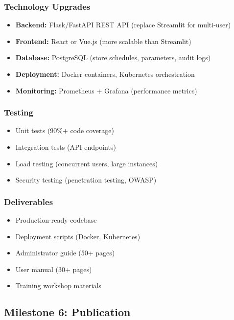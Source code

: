 \documentclass[11pt,letterpaper]{article}
\begin{document}
\subsubsection{Technology Upgrades}
\begin{itemize}[leftmargin=*]
    \item \textbf{Backend:} Flask/FastAPI REST API (replace Streamlit for multi-user)
    \item \textbf{Frontend:} React or Vue.js (more scalable than Streamlit)
    \item \textbf{Database:} PostgreSQL (store schedules, parameters, audit logs)
    \item \textbf{Deployment:} Docker containers, Kubernetes orchestration
    \item \textbf{Monitoring:} Prometheus + Grafana (performance metrics)
\end{itemize}

\subsubsection{Testing}
\begin{itemize}[leftmargin=*]
    \item Unit tests (90\%+ code coverage)
    \item Integration tests (API endpoints)
    \item Load testing (concurrent users, large instances)
    \item Security testing (penetration testing, OWASP)
\end{itemize}

\subsubsection{Deliverables}
\begin{itemize}[leftmargin=*]
    \item Production-ready codebase
    \item Deployment scripts (Docker, Kubernetes)
    \item Administrator guide (50+ pages)
    \item User manual (30+ pages)
    \item Training workshop materials
\end{itemize}

\subsection{Milestone 6: Publication}
\end{document}
